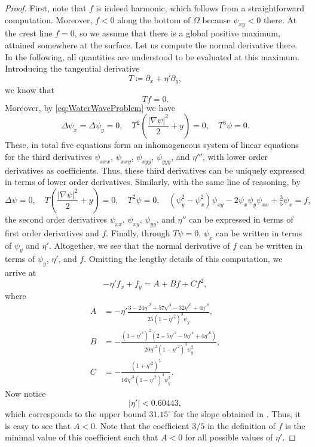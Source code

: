 \documentclass{amsart}
\theoremstyle{definition}
\begin{document}
\begin{proof}
	First, note that $f$ is indeed harmonic, which follows from a straightforward computation. Moreover, $f < 0$ along the bottom of $\Omega$ because $\psi_{xy} < 0$ there. At the crest line $f = 0$, so we assume that there is a global positive maximum, attained  somewhere at the surface. Let us compute the normal derivative there. In the following, all quantities are understood to be evaluated at this maximum. Introducing the tangential derivative
	\[T\coloneqq \partial_x + \eta'\partial_y,\]
	we know that
	\[Tf = 0.\]
	Moreover, by \eqref{eq:WaterWaveProblem} we have
	\[\Delta\psi_x = \Delta\psi_y = 0, \quad T^2\left(\frac{|\nabla\psi|^2}{2}+y\right) = 0, \quad T^3\psi = 0.\]
	These, in total five equations form an inhomogeneous system of linear equations for the third derivatives $\psi_{xxx}$, $\psi_{xxy}$, $\psi_{xyy}$, $\psi_{yyy}$, and $\eta'''$, with lower order derivatives as coefficients. Thus, these third derivatives can be uniquely expressed in terms of lower order derivatives. Similarly, with the same line of reasoning, by
	\[\Delta\psi = 0,\quad T\left(\frac{|\nabla\psi|^2}{2}+y\right) = 0, \quad T^2\psi = 0,\quad (\psi_y^2-\psi_x^2)\psi_{xy}-2\psi_x\psi_y\psi_{xx}+\tfrac35\psi_x = f,\]
	the second order derivatives $\psi_{xx}$, $\psi_{xy}$, $\psi_{yy}$, and $\eta''$ can be expressed in terms of first order derivatives and $f$. Finally, through $T\psi=0$, $\psi_x$ can be written in terms of $\psi_y$ and $\eta'$. Altogether, we see that the normal derivative of $f$ can be written in terms of $\psi_y$, $\eta'$, and $f$. Omitting the lengthy details of this computation, we arrive at
	\begin{equation} \label{eq:slope:1}
		-\eta' f_x + f_y = A + B f + C f^2,
	\end{equation}
	where
	\begin{align*}
		A &= -\eta' \frac{3-24\eta'^2+57\eta'^4-32\eta'^6+4\eta'^8}{25(1-\eta'^2)^3\psi_y},\\
		B &= -\frac{(1+\eta'^2)^2(2-5\eta'^2-9\eta'^4+4\eta'^6)}{20\eta'^2(1-\eta'^2)^3\psi_y^2},\\
		C &= -\frac{(1+\eta'^2)^5}{16 \eta'^3 (1-\eta'^2)^3\psi_y^3}.
	\end{align*}
	Now notice
	\begin{equation}\label{eq:maxslope}
		|\eta'| < 0.60443,
	\end{equation}
	which corresponds to the upper bound $31.15^\circ$ for the slope obtained in \cite{Amick1987}. Thus, it is easy to see that $A<0$. 
	Note that the coefficient $3/5$ in the definition of $f$ is the minimal value of this coefficient such that $A<0$ for all possible values of $\eta'$.
	

\end{proof}
\end{document}
